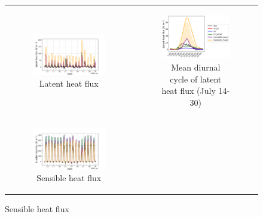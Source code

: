\begin{figure}[hbtp]
    \centering
    \begin{tabular}{cc}
        \begin{subfigure}[t]{0.5\textwidth}
            \caption{Latent heat flux}
            \includegraphics[width=\textwidth]{images/chap5/SOP_TS_DC/time_series_elsplans_flat.png}
        \end{subfigure} &
        \begin{subfigure}[t]{0.5\textwidth}
            \caption{Mean diurnal cycle of latent heat flux (July 14-30)}
            \includegraphics[width=\textwidth]{images/chap5/SOP_TS_DC/diurnal_cycle_elsplans_flat.png}
        \end{subfigure} \\
        \begin{subfigure}[t]{0.5\textwidth}
            \caption{Sensible heat flux}
            \includegraphics[width=\textwidth]{images/chap5/SOP_TS_DC/time_series_elsplans_sens.png}

\end{subfigure}
\end{tabular}
\end{figure}

